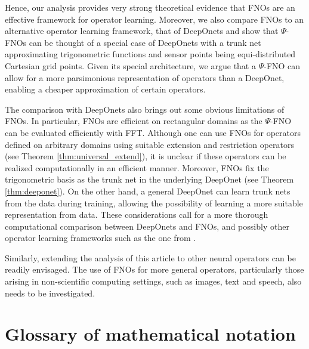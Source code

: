 \documentclass[reqno,a4paper]{amsart}
\begin{document}
Hence, our analysis provides very strong theoretical evidence that FNOs are an effective framework for operator learning. Moreover, we also compare FNOs to an alternative operator learning framework, that of DeepOnets \cite{deeponets} and show that $\Psi$-FNOs can be thought of a special case of DeepOnets with a trunk net approximating trigonometric functions and sensor points being equi-distributed Cartesian grid points. Given its special architecture, we argue that a $\Psi$-FNO can allow for a more parsimonious representation of operators than a DeepOnet, enabling a cheaper approximation of certain operators. 

The comparison with DeepOnets also brings out some obvious limitations of FNOs. In particular, FNOs are efficient on rectangular domains as the $\Psi$-FNO can be evaluated efficiently with FFT. Although one can use FNOs for operators defined on arbitrary domains using suitable extension and restriction operators (see Theorem \ref{thm:universal_extend}), it is unclear if these operators can be realized computationally in an efficient manner. Moreover, FNOs fix the trigonometric basis as the trunk net in the underlying DeepOnet (see Theorem \ref{thm:deeponet}). On the other hand, a general DeepOnet can learn trunk nets from the data during training, allowing the possibility of learning a more suitable representation from data. These considerations call for a more thorough computational comparison between DeepOnets and FNOs, and possibly other operator learning frameworks such as the one from \cite{bhattacharya2020model}.

Similarly, extending the analysis of this article to other neural operators can be readily envisaged. The use of FNOs for more general operators, particularly those arising in non-scientific computing settings, such as images, text and speech, also needs to be investigated. 








\appendix
\section{Glossary of mathematical notation}
\label{sec:glos}
\end{document}
